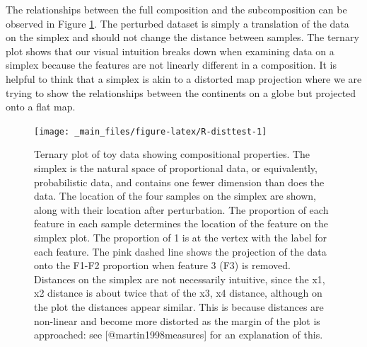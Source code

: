\documentclass[onecolumn]{article}
\begin{document}
The relationships between the full composition and the subcomposition can be observed in Figure \ref{fig:R-disttest}. The perturbed dataset is simply a translation of the data on the simplex and should not change the distance between samples. The ternary plot shows that our visual intuition breaks down when examining data on a simplex because the features are not linearly different in a composition. It is helpful to think that a simplex is akin to a distorted map projection where we are trying to show the relationships between the continents on a globe but projected onto a flat map.

\begin{figure}

{\centering \texttt{[image: \_main\_files/figure-latex/R-disttest-1]} 

}

\caption{Ternary plot of toy data showing compositional properties. The simplex is the natural space of proportional data, or equivalently, probabilistic data, and contains one fewer dimension than does the data. The location of the four samples on the simplex are shown, along with their location after perturbation. The proportion of each feature in each sample determines the location of the feature on the simplex plot. The proportion of 1 is at the vertex with the label for each feature. The pink dashed line shows the projection of the data onto the F1-F2 proportion when feature 3 (F3) is removed. Distances on the simplex are not necessarily intuitive, since the x1, x2 distance is about twice that of the x3, x4 distance, although on the plot the distances appear similar. This is because distances are non-linear and become more distorted as the margin of the plot is approached: see [@martin1998measures] for an explanation of this.}\label{fig:R-disttest}
\end{figure}
\end{document}
